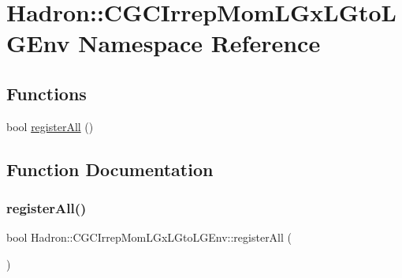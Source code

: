 \hypertarget{namespaceHadron_1_1CGCIrrepMomLGxLGtoLGEnv}{}\section{Hadron\+:\+:C\+G\+C\+Irrep\+Mom\+L\+Gx\+L\+Gto\+L\+G\+Env Namespace Reference}
\label{namespaceHadron_1_1CGCIrrepMomLGxLGtoLGEnv}
\subsection*{Functions}
\begin{DoxyCompactItemize}
\item 
bool \mbox{\hyperlink{namespaceHadron_1_1CGCIrrepMomLGxLGtoLGEnv_ab765f2f3a5f090ad99642c37e973a15d}{register\+All}} ()
\end{DoxyCompactItemize}


\subsection{Function Documentation}
\mbox{\label{namespaceHadron_1_1CGCIrrepMomLGxLGtoLGEnv_ab765f2f3a5f090ad99642c37e973a15d}} 
\subsubsection{\texorpdfstring{registerAll()}{registerAll()}}
{\footnotesize\ttfamily bool Hadron\+::\+C\+G\+C\+Irrep\+Mom\+L\+Gx\+L\+Gto\+L\+G\+Env\+::register\+All (\begin{DoxyParamCaption}{ }\end{DoxyParamCaption})}

